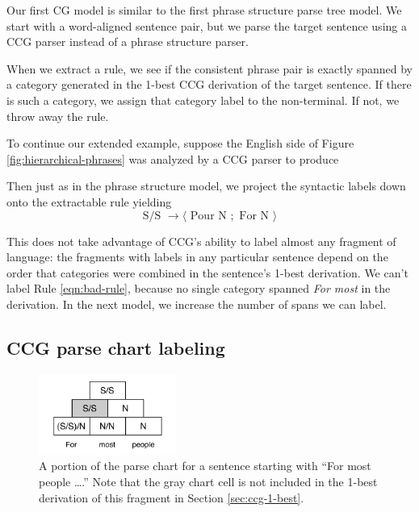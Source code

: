 \documentclass[a4paper]{article}
\begin{document}
Our first CG model is similar to the first phrase structure parse tree model. We start with a word-aligned sentence pair, but we parse the target sentence using a CCG parser instead of a phrase structure parser.

When we extract a rule, we see if the consistent phrase pair is exactly spanned by a category generated in the 1-best CCG derivation of the target sentence. If there is such a category, we assign that category label to the non-terminal. If not, we throw away the rule.

To continue our extended example, suppose the English side of Figure \ref{fig:hierarchical-phrases} was analyzed by a CCG parser to produce
\begin{center}
\end{center}
Then just as in the phrase structure model, we project the syntactic labels down onto the extractable rule yielding
\begin{equation}
\label{eqn:ccg-rule}
\textrm{S/S } \to \langle \textrm{ Pour N }; \textrm{ For N } \rangle
\end{equation}

This does not take advantage of CCG's ability to label almost any fragment of language: the fragments with labels in any particular sentence depend on the order that categories were combined in the sentence's 1-best derivation.  We can't label Rule \ref{eqn:bad-rule}, because no single category spanned {\em For most} in the derivation. In the next model, we increase the number of spans we can label.

\subsection{CCG parse chart labeling}

\begin{figure}[t]
\centering
\includegraphics[width=0.4\textwidth]{figures/ccg-chart}
\caption{A portion of the parse chart for a sentence starting with ``For most people \ldots.'' Note that the gray chart cell is not included in the 1-best derivation of this fragment in Section \ref{sec:ccg-1-best}.\label{fig:chart}} 
\end{figure}
\end{document}
